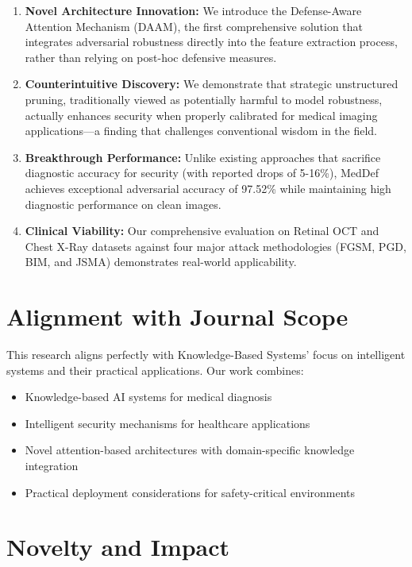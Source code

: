\documentclass[12pt]{article}
\begin{document}
\begin{enumerate}
    \item \textbf{Novel Architecture Innovation:} We introduce the Defense-Aware Attention Mechanism (DAAM), the first comprehensive solution that integrates adversarial robustness directly into the feature extraction process, rather than relying on post-hoc defensive measures.
    
    \item \textbf{Counterintuitive Discovery:} We demonstrate that strategic unstructured pruning, traditionally viewed as potentially harmful to model robustness, actually enhances security when properly calibrated for medical imaging applications—a finding that challenges conventional wisdom in the field.
    
    \item \textbf{Breakthrough Performance:} Unlike existing approaches that sacrifice diagnostic accuracy for security (with reported drops of 5-16\%), MedDef achieves exceptional adversarial accuracy of 97.52\% while maintaining high diagnostic performance on clean images.
    
    \item \textbf{Clinical Viability:} Our comprehensive evaluation on Retinal OCT and Chest X-Ray datasets against four major attack methodologies (FGSM, PGD, BIM, and JSMA) demonstrates real-world applicability.
\end{enumerate}

\section*{Alignment with Journal Scope}

This research aligns perfectly with Knowledge-Based Systems' focus on intelligent systems and their practical applications. Our work combines:
\begin{itemize}
    \item Knowledge-based AI systems for medical diagnosis
    \item Intelligent security mechanisms for healthcare applications
    \item Novel attention-based architectures with domain-specific knowledge integration
    \item Practical deployment considerations for safety-critical environments
\end{itemize}

\section*{Novelty and Impact}
\end{document}
